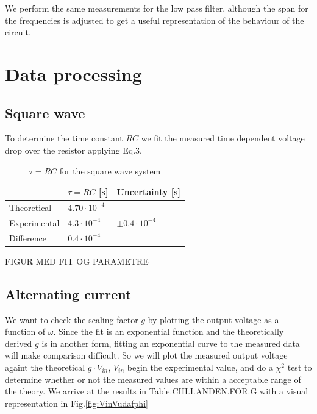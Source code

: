 \documentclass[../main/main.tex]{subfiles}
\begin{document}
We perform the same measurements for the low pass filter, although the span for the frequencies is adjusted to get a useful representation of the behaviour of the circuit.

\section{Data processing}

\subsection*{Square wave}

To determine the time constant \( RC \) we fit the measured time dependent voltage drop over the resistor applying Eq.3.

\begin{table}[]
\centering
\caption{\( \tau = RC \) for the square wave system}
\label{data_square}
\begin{tabular}{|l|l|l|}
\hline
             & \( \tau = RC\) [s]       & Uncertainty [s]                         \\ \hline
Theoretical  & \( 4.70 \cdot 10^{-4} \) &                                         \\ \hline
Experimental & \( 4.3 \cdot 10^{-4} \)  & \( \pm 0.4 \cdot 10^{-4} \)             \\ \hline
Difference   & \( 0.4 \cdot 10^{-4} \)  &                                         \\ \hline
\end{tabular}
\end{table}

FIGUR MED FIT OG PARAMETRE

\subsection*{Alternating current}

We want to check the scaling factor \( g \) by plotting the output voltage as a function of \( \omega \).
Since the fit is an exponential function and the theoretically derived \( g \) is in another form, fitting an exponential curve to the measured data will make comparison difficult. So we will plot the measured output voltage againt the theoretical \( g \cdot V_{in} \), \( V_{in} \) begin the experimental value, and do a \( \chi^2 \) test to determine whether or not the measured values are within a acceptable range of the theory.
We arrive at the results in Table.CHI.I.ANDEN.FOR.G with a visual representation in Fig.\ref{fig:VinVudafphi}
\end{document}
